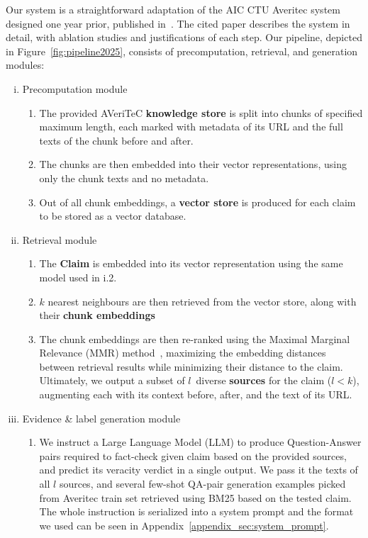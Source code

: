 Our system is a straightforward adaptation of the AIC CTU Averitec system designed one year prior, published in~\cite{ullrich-etal-2024-aic}.
The cited paper describes the system in detail, with ablation studies and justifications of each step.
Our pipeline, depicted in Figure~\ref{fig:pipeline2025}, consists of precomputation, retrieval, and generation modules:

\begin{enumerate}[i.]  %
    \item Precomputation module
    \begin{enumerate}[1.]  %
        \item The provided AVeriTeC \textbf{knowledge store} \cite{averitec2024} is split into chunks of specified maximum length, each marked with metadata of its URL and the full texts of the chunk before and after.
        \item The chunks are then embedded into their vector representations, using only the chunk texts and no metadata.
        \item Out of all chunk embeddings, a \textbf{vector store} is produced for each claim to be stored as a vector database.
    \end{enumerate}
    \item Retrieval module
    \begin{enumerate}[1.]   %
        \item The \textbf{Claim} is embedded into its vector representation using the same model used in i.2.
        \item $k$ nearest neighbours are then retrieved from the vector store, along with their \textbf{chunk embeddings}
        \item The chunk embeddings are then re-ranked using the Maximal Marginal Relevance (MMR) method~\cite{carbonell-mmr}, maximizing the embedding distances between retrieval results while minimizing their distance to the claim.
        Ultimately, we output a subset of $l$~diverse \textbf{sources} for the claim ($l<k$), augmenting each with its context before, after, and the text of its URL.
    \end{enumerate}
    \item Evidence \& label generation module
    \begin{enumerate}[1.]   %
        \item We instruct a Large Language Model (LLM) to produce Question-Answer pairs required to fact-check given claim based on the provided sources, and predict its veracity verdict in a single output. We pass it the texts of all $l$ sources, and several few-shot QA-pair generation examples picked from Averitec train set retrieved using BM25 based on the tested claim. The whole instruction is serialized into a system prompt and the format we used can be seen in Appendix~\ref{appendix_sec:system_prompt}.

\end{enumerate}
\end{enumerate}
